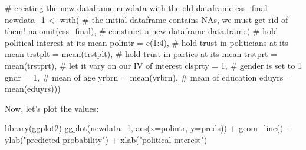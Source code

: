\documentclass[
  letterpaper,
  DIV=11,
  numbers=noendperiod]{scrreprt}
\newenvironment{Shaded}{\begin{snugshade}}{\end{snugshade}}
\newcommand{\AttributeTok}[1]{\textcolor[rgb]{0.40,0.45,0.13}{#1}}
\newcommand{\CommentTok}[1]{\textcolor[rgb]{0.37,0.37,0.37}{#1}}
\newcommand{\DecValTok}[1]{\textcolor[rgb]{0.68,0.00,0.00}{#1}}
\newcommand{\FunctionTok}[1]{\textcolor[rgb]{0.28,0.35,0.67}{#1}}
\newcommand{\NormalTok}[1]{\textcolor[rgb]{0.00,0.23,0.31}{#1}}
\newcommand{\OtherTok}[1]{\textcolor[rgb]{0.00,0.23,0.31}{#1}}
\newcommand{\SpecialCharTok}[1]{\textcolor[rgb]{0.37,0.37,0.37}{#1}}
\newcommand{\StringTok}[1]{\textcolor[rgb]{0.13,0.47,0.30}{#1}}
\begin{document}
\begin{Shaded}
\begin{Highlighting}[]
\CommentTok{\# creating the new dataframe newdata with the old dataframe ess\_final}
\NormalTok{newdata\_1 }\OtherTok{\textless{}{-}} \FunctionTok{with}\NormalTok{(}
  \CommentTok{\# the initial dataframe contains NAs, we must get rid of them!}
  \FunctionTok{na.omit}\NormalTok{(ess\_final),}
  \CommentTok{\# construct a new dataframe}
  \FunctionTok{data.frame}\NormalTok{(}
    \CommentTok{\# hold political interest at its mean}
    \AttributeTok{polintr =} \FunctionTok{c}\NormalTok{(}\DecValTok{1}\SpecialCharTok{:}\DecValTok{4}\NormalTok{),}
    \CommentTok{\# hold trust in politicians at its mean}
    \AttributeTok{trstplt =} \FunctionTok{mean}\NormalTok{(trstplt),}
    \CommentTok{\# hold trust in parties at its mean}
    \AttributeTok{trstprt =} \FunctionTok{mean}\NormalTok{(trstprt),}
    \CommentTok{\# let it vary on our IV of interest}
    \AttributeTok{clsprty =} \DecValTok{1}\NormalTok{,}
    \CommentTok{\# gender is set to 1}
    \AttributeTok{gndr =} \DecValTok{1}\NormalTok{,}
    \CommentTok{\# mean of age}
    \AttributeTok{yrbrn =} \FunctionTok{mean}\NormalTok{(yrbrn),}
    \CommentTok{\# mean of education}
    \AttributeTok{eduyrs =} \FunctionTok{mean}\NormalTok{(eduyrs)))}
\end{Highlighting}
\end{Shaded}

\begin{Shaded}
\end{Shaded}

Now, let's plot the values:

\begin{Shaded}
\begin{Highlighting}[]
\FunctionTok{library}\NormalTok{(ggplot2)}
\FunctionTok{ggplot}\NormalTok{(newdata\_1, }\FunctionTok{aes}\NormalTok{(}\AttributeTok{x=}\NormalTok{polintr, }\AttributeTok{y=}\NormalTok{preds)) }\SpecialCharTok{+}
   \FunctionTok{geom\_line}\NormalTok{() }\SpecialCharTok{+}
   \FunctionTok{ylab}\NormalTok{(}\StringTok{"predicted probability"}\NormalTok{) }\SpecialCharTok{+} \FunctionTok{xlab}\NormalTok{(}\StringTok{"political interest"}\NormalTok{)}
\end{Highlighting}
\end{Shaded}
\end{document}

